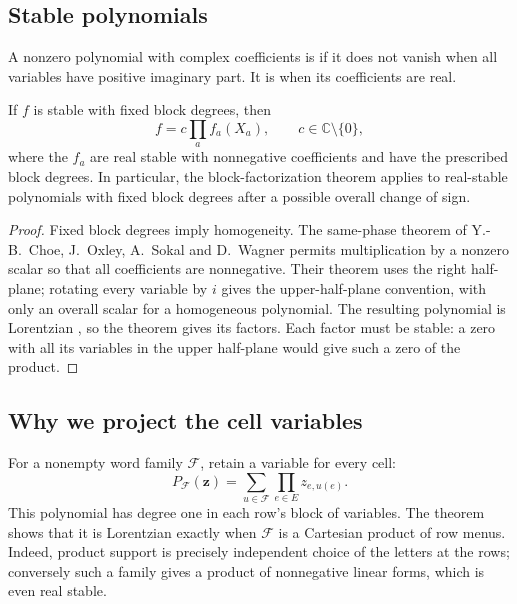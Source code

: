 \subsection[stableBlockFactorization]{Stable polynomials}

A nonzero polynomial with complex coefficients is  if it
does not vanish when all variables have positive imaginary part. It is
 when its coefficients are real.

\begin{corollary}
If $f$ is stable with fixed block degrees, then
\[
 f=c\prod_a f_a(X_a),\qquad c\in\mathbb C\setminus\{0\},
\]
where the $f_a$ are real stable with nonnegative coefficients and have
the prescribed block degrees. In particular, the block-factorization
theorem applies to real-stable polynomials with fixed block degrees
after a possible overall change of sign.
\end{corollary}

\begin{proof}
Fixed block degrees imply homogeneity. The same-phase theorem of
Y.-B.~Choe, J.~Oxley, A.~Sokal and D.~Wagner
\cite[Theorem~6.1]{ChoeOxleySokalWagner2004} permits multiplication by
a nonzero scalar so that all coefficients are nonnegative. Their theorem
uses the right half-plane; rotating every variable by $i$ gives the
upper-half-plane convention, with only an overall scalar for a homogeneous
polynomial. The resulting polynomial is Lorentzian
\cite[Proposition~2.2]{BrandenHuh2020}, so the theorem gives its factors.
Each factor must be stable: a zero with all its variables in the upper
half-plane would give such a zero of the product.
\end{proof}

\subsection[cellVariableBoundary]{Why we project the cell variables}

For a nonempty word family $\mathcal F$, retain a variable for every cell:
\[
 P_{\mathcal F}(\mathbf z)=\sum_{u\in\mathcal F}\prod_{e\in E}z_{e,u(e)}.
\]
This polynomial has degree one in each row's block of variables. The
theorem shows that it is Lorentzian exactly when $\mathcal F$ is a
Cartesian product of row menus. Indeed, product support is precisely
independent choice of the letters at the rows; conversely such a family
gives a product of nonnegative linear forms, which is even real stable.

